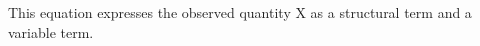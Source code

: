 \documentclass[preview]{standalone}
\begin{document}
\begin{center}
This equation expresses the observed quantity X as a structural term and a variable term.
\end{center}
\end{document}
